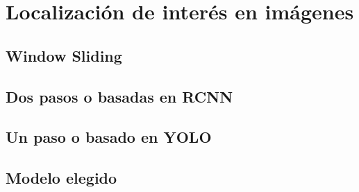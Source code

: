 \chapter{Localización de interés en imágenes}

\section{Window Sliding}

\section{Dos pasos o basadas en RCNN}

\section{Un paso o basado en YOLO}

\section{Modelo elegido}
